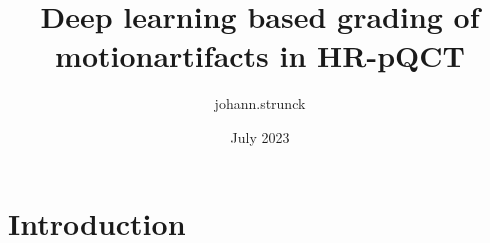 \documentclass{article}
\title{Deep learning based grading of motionartifacts in HR-pQCT}
\author{johann.strunck }
\date{July 2023}
\begin{document}
	\maketitle
	
	\section{Introduction}
	
\end{document}
